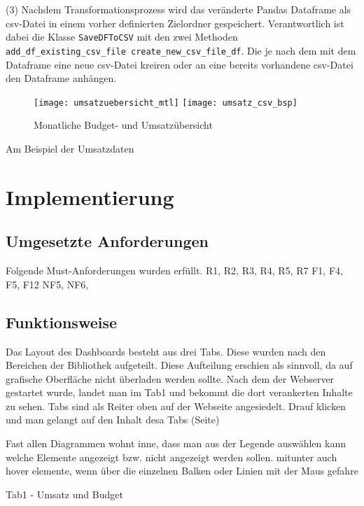     (3) Nachdem Transformationsprozess wird das veränderte Pandas Dataframe als csv-Datei in einem vorher definierten Zielordner gespeichert. 
    Verantwortlich ist dabei die Klasse \texttt{SaveDFToCSV} mit den zwei Methoden \texttt{add\_df\_existing\_csv\_file create\_new\_csv\_file\_df}. 
    Die je nach dem mit dem Dataframe eine neue csv-Datei kreiren oder an eine bereits vorhandene csv-Datei den Dataframe anhängen.
    
    \begin{figure}[h]
        \centering
            \texttt{[image: umsatzuebersicht\_mtl]}
            \texttt{[image: umsatz\_csv\_bsp]}
            \caption{Monatliche Budget- und Umsatzübersicht}
            \label{fig:umsatzuebersicht_csv}
    \end{figure}
    

    Am Beispiel der Umsatzdaten 
    

\section{Implementierung}

  

    \subsection{Umgesetzte Anforderungen}
    Folgende Must-Anforderungen wurden erfüllt.
    R1, R2, R3, R4, R5, R7
    F1, F4, F5, F12
    NF5, NF6, 
    \subsection{Funktionsweise}
    Das Layout des Dashboards besteht aus drei Tabs. Diese wurden nach den Bereichen der Bibliothek aufgeteilt. Diese Aufteilung erschien als sinnvoll,
    da auf grafische Oberfläche nicht überladen werden sollte.
    Nach dem der Webserver gestartet wurde, landet man im Tab1 und bekommt die dort verankerten Inhalte zu sehen.
    Tabs sind als Reiter oben auf der Webseite angesiedelt.
    Drauf klicken und man gelangt auf den Inhalt desa Tabs (Seite)
    
    Fast allen Diagrammen wohnt inne, dass man aus der Legende auswählen kann welche Elemente angezeigt bzw. nicht angezeigt werden sollen.
    mitunter auch hover elemente, wenn über die einzelnen Balken oder Linien mit der Maus gefahre 
    
    Tab1 - Umsatz und Budget
    
